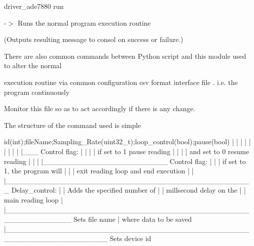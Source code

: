 \begin{DoxyVerb}driver_ade7880  run \end{DoxyVerb}
 -\/$>$ Runs the normal program execution routine \par
 (Outputs resulting message to consol on success or failure.)\par
\par


There are also common commands between Python script and this module used to alter the normal \par
 execution routine via common configuration csv format interface file . i.\-e. the program continuously \par
 Monitor this file so as to act accordingly if there is any change.

The structure of the command used is simple \par


\begin{DoxyVerb}id(int);fileName;Sampling_Rate(uint32_t);loop_control(bool);pause(bool)
   |      |           |                       |                    |
   |      |           |                       |                    |___ Control flag: 
   |      |           |                       |                           if set to 1 pause reading
   |      |           |                       |                           and set to 0 resume reading
   |      |           |                       |________________________ Control flag: 
   |      |           |                                                   if set to 1, the program will
   |      |           |                                                   exit reading loop and end execution    
   |      |           |________________________________________________ Delay_control: 
   |      |                                                               Adds the specified number of
   |      |                                                               millsecond delay on the    
   |      |                                                               main reading loop
   |      |____________________________________________________________ Sets file name 
   |                                                                    where data to be saved   
   |___________________________________________________________________ Sets device id  \end{DoxyVerb}
 

